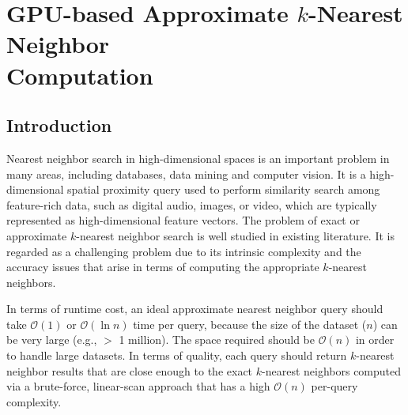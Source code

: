 \chapter{GPU-based Approximate $k$-Nearest Neighbor \\ Computation} 
\label{chp:GLSH}

\section{Introduction}
Nearest neighbor search in high-dimensional spaces is an important problem in many areas, including databases, data mining and computer vision. It is a high-dimensional spatial proximity query used to perform similarity search among feature-rich data, such as digital audio, images, or video, which are typically represented as high-dimensional feature vectors. The problem of exact or approximate $k$-nearest neighbor search is well studied in existing literature. It is regarded as a challenging problem due to its intrinsic complexity and the accuracy issues that arise in terms of computing the appropriate $k$-nearest neighbors.

In terms of runtime cost, an ideal approximate nearest neighbor query should take $\mathcal O(1)$ or $\mathcal O(\ln n)$ time per query, because the size of the dataset ($n$) can be very large (e.g., $>$ 1 million). The space required should be $\mathcal O(n)$ in order to handle large datasets. In terms of quality, each query should return $k$-nearest neighbor results that are close enough to the exact $k$-nearest neighbors computed via a brute-force, linear-scan approach that has a high $\mathcal O(n)$ per-query complexity.

